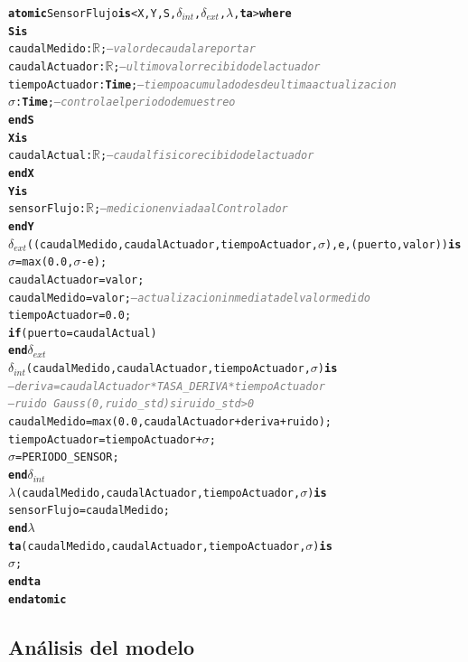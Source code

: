 \documentclass[12pt, a4paper]{article}
\newcommand{\kw}[1]{\textbf{#1}}
\newcommand{\cmlR}{$\mathbb{R}$}
\newcommand{\cmlTime}{\textbf{Time}}
\newcommand{\cmlsigma}{$\sigma$}
\newcommand{\dint}{$\delta_{\mathit{int}}$}
\newcommand{\dext}{$\delta_{\mathit{ext}}$}
\newcommand{\clambda}{$\lambda$}
\newcommand{\cmlta}{\textbf{ta}}
\newcommand{\cmlcomment}[1]{\textit{\textcolor{gray}{#1}}}
\newenvironment{cmldevs}{%
  \begin{alltt}\small%
}{%
  \end{alltt}%
}
\begin{document}
\begin{center}
\begin{cmldevs}
\kw{atomic} SensorFlujo \kw{is} <X, Y, S, \dint{}, \dext{}, \clambda{}, \cmlta{}> \kw{where}
\kw{S is}
    caudalMedido    : \cmlR{};     \cmlcomment{-- valor de caudal a reportar}
    caudalActuador  : \cmlR{};     \cmlcomment{-- ultimo valor recibido del actuador}
    tiempoActuador  : \cmlTime{};  \cmlcomment{-- tiempo acumulado desde ultima actualizacion}
    \cmlsigma{}               : \cmlTime{}; \cmlcomment{-- controla el periodo de muestreo}
\kw{end S}
\kw{X is}
    caudalActual : \cmlR{};  \cmlcomment{-- caudal fisico recibido del actuador}
\kw{end X}
\kw{Y is}
    sensorFlujo  : \cmlR{};  \cmlcomment{-- medicion enviada al Controlador}
\kw{end Y}
\dext{}((caudalMedido, caudalActuador, tiempoActuador, \cmlsigma{}), e, (puerto, valor)) \kw{is}
    \cmlsigma{}     = max(0.0, \cmlsigma{} - e);
    caudalActuador  = valor;
    caudalMedido    = valor;   \cmlcomment{-- actualizacion inmediata del valor medido}
    tiempoActuador  = 0.0;
        \kw{if} (puerto = caudalActual)
\kw{end} \dext{}
\dint{}(caudalMedido, caudalActuador, tiempoActuador, \cmlsigma{}) \kw{is}
    \cmlcomment{-- deriva = caudalActuador * TASA\_DERIVA * tiempoActuador}
    \cmlcomment{-- ruido  ~ Gauss(0, ruido\_std)  si ruido\_std > 0}
    caudalMedido   = max(0.0, caudalActuador + deriva + ruido);
    tiempoActuador = tiempoActuador + \cmlsigma{};
    \cmlsigma{}    = PERIODO\_SENSOR;
\kw{end} \dint{}
\clambda{}(caudalMedido, caudalActuador, tiempoActuador, \cmlsigma{}) \kw{is}
    sensorFlujo = caudalMedido;
\kw{end} \clambda{}
\cmlta{}(caudalMedido, caudalActuador, tiempoActuador, \cmlsigma{}) \kw{is}
    \cmlsigma{};
\kw{end} \cmlta{}
\kw{end atomic}
\end{cmldevs}
\label{fig:sensor-flujo}
\end{center}

\subsection*{Análisis del modelo}
\end{document}
